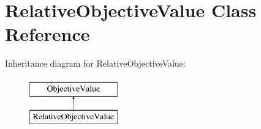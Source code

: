 \hypertarget{classRelativeObjectiveValue}{\section{Relative\-Objective\-Value Class Reference}
\label{classRelativeObjectiveValue}
}
Inheritance diagram for Relative\-Objective\-Value\-:\begin{figure}[H]
\begin{center}
\leavevmode
\includegraphics[height=2.000000cm]{classRelativeObjectiveValue}
\end{center}
\end{figure}
